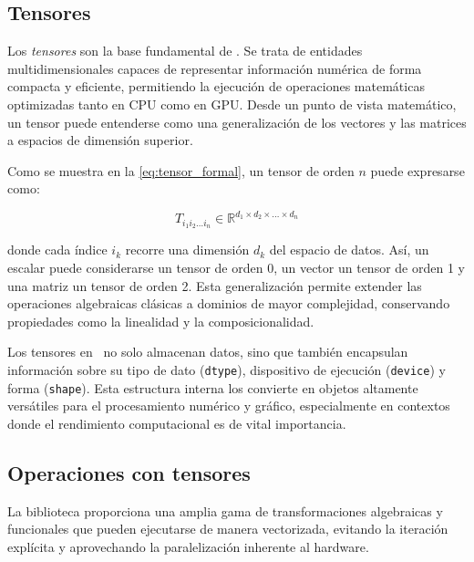 \newpage
\subsection{Tensores} \label{sec:intro_tensors}
Los \textit{tensores} son la base fundamental de \pytorch. Se trata de entidades multidimensionales capaces de representar información numérica de
forma compacta y eficiente, permitiendo la ejecución de operaciones matemáticas optimizadas tanto en CPU como en GPU. Desde un punto
de vista matemático, un tensor puede entenderse como una generalización de los vectores y las matrices a espacios de dimensión superior.

Como se muestra en la \autoref{eq:tensor_formal}, un tensor de orden $n$ puede expresarse como:

\begin{myequation}
	\begin{equation}
		T_{i_1 i_2 \ldots i_n} \in \mathbb{R}^{d_1 \times d_2 \times \ldots \times d_n}
		\label{eq:tensor_formal}
	\end{equation}
	\caption{Representación formal de un tensor de orden $n$}
\end{myequation}

donde cada índice $i_k$ recorre una dimensión $d_k$ del espacio de datos. Así, un escalar puede considerarse un tensor de orden 0,
un vector un tensor de orden 1 y una matriz un tensor de orden 2. Esta generalización permite extender las operaciones algebraicas
clásicas a dominios de mayor complejidad, conservando propiedades como la linealidad y la composicionalidad.

Los tensores en \pytorch\ no solo almacenan datos, sino que también encapsulan información sobre su tipo de dato
(\texttt{dtype}), dispositivo de ejecución (\texttt{device}) y forma (\texttt{shape}). Esta estructura interna los convierte en
objetos altamente versátiles para el procesamiento numérico y gráfico, especialmente en contextos donde el rendimiento computacional
es de vital importancia.

\subsection{Operaciones con tensores} \label{sec:intro_tensor_operations}
La biblioteca proporciona una amplia gama de transformaciones algebraicas y funcionales que pueden ejecutarse de manera vectorizada,
evitando la iteración explícita y aprovechando la paralelización inherente al hardware.

